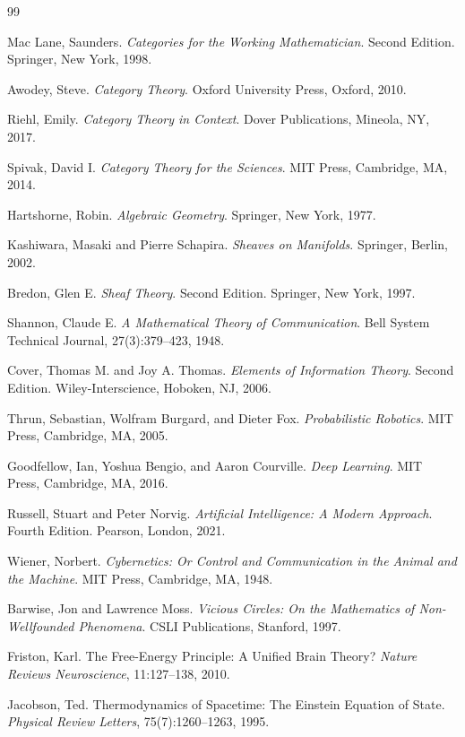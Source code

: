 \documentclass[11pt]{article}
\begin{document}
\newpage
\begin{thebibliography}{99}

Mac Lane, Saunders.
\textit{Categories for the Working Mathematician}.
Second Edition. Springer, New York, 1998.

Awodey, Steve.
\textit{Category Theory}.
Oxford University Press, Oxford, 2010.

Riehl, Emily.
\textit{Category Theory in Context}.
Dover Publications, Mineola, NY, 2017.

Spivak, David I.
\textit{Category Theory for the Sciences}.
MIT Press, Cambridge, MA, 2014.

Hartshorne, Robin.
\textit{Algebraic Geometry}.
Springer, New York, 1977.

Kashiwara, Masaki and Pierre Schapira.
\textit{Sheaves on Manifolds}.
Springer, Berlin, 2002.

Bredon, Glen E.
\textit{Sheaf Theory}.
Second Edition. Springer, New York, 1997.

Shannon, Claude E.
\textit{A Mathematical Theory of Communication}.
Bell System Technical Journal, 27(3):379--423, 1948.

Cover, Thomas M. and Joy A. Thomas.
\textit{Elements of Information Theory}.
Second Edition. Wiley-Interscience, Hoboken, NJ, 2006.

Thrun, Sebastian, Wolfram Burgard, and Dieter Fox.
\textit{Probabilistic Robotics}.
MIT Press, Cambridge, MA, 2005.

Goodfellow, Ian, Yoshua Bengio, and Aaron Courville.
\textit{Deep Learning}.
MIT Press, Cambridge, MA, 2016.

Russell, Stuart and Peter Norvig.
\textit{Artificial Intelligence: A Modern Approach}.
Fourth Edition. Pearson, London, 2021.

Wiener, Norbert.
\textit{Cybernetics: Or Control and Communication in the Animal and the Machine}.
MIT Press, Cambridge, MA, 1948.

Barwise, Jon and Lawrence Moss.
\textit{Vicious Circles: On the Mathematics of Non-Wellfounded Phenomena}.
CSLI Publications, Stanford, 1997.

Friston, Karl.
The Free-Energy Principle: A Unified Brain Theory?
\textit{Nature Reviews Neuroscience}, 11:127--138, 2010.

Jacobson, Ted.
Thermodynamics of Spacetime: The Einstein Equation of State.
\textit{Physical Review Letters}, 75(7):1260--1263, 1995.

\end{thebibliography}
\end{document}

